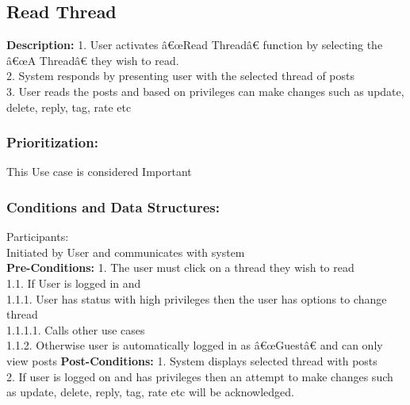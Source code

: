 \documentclass[a4paper,11pt]{article}
\begin{document}
\subsection{Read Thread}
\textbf{Description:}
1.	User activates â€œRead Threadâ€ function by selecting the â€œA Threadâ€ they wish to read.\\
2.	System responds by presenting user with the selected thread of posts\\
3.	User reads the posts and based on privileges can make changes such as update, delete, reply, tag, rate etc\\

\subsubsection{Prioritization:}
This Use case is considered Important\\ 
\subsubsection{Conditions and Data Structures:}
Participants:\\
Initiated by User and communicates with system\\
\textbf{Pre-Conditions:}
1.	The user must click on a thread they wish to read\\
1.1.	If User is logged in and\\
1.1.1.	User has status with high privileges then the user has options to change thread\\
1.1.1.1.	Calls other use cases\\
1.1.2.	Otherwise user is automatically logged in as â€œGuestâ€ and can only view posts
\textbf{Post-Conditions:}
1.	System displays selected thread with posts\\
2.	If user is logged on and has privileges then an attempt to make changes such as update, delete, reply, tag, rate etc will be acknowledged. 
\end{document}
